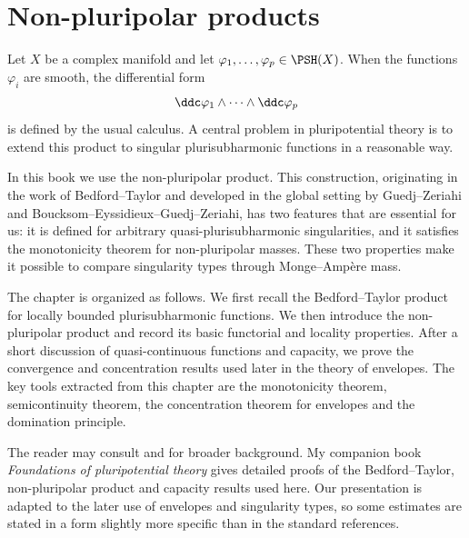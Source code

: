 \chapter{Non-pluripolar products}
\label{chap:npp}

Let $X$ be a complex manifold and let $\varphi_1,\ldots,\varphi_p\in\PSH(X)$. When the functions $\varphi_i$ are smooth, the differential form
\begin{equation}\label{eq:mixedMAtype}
    \ddc\varphi_1\wedge\cdots\wedge\ddc\varphi_p
\end{equation}
is defined by the usual calculus. A central problem in pluripotential theory is to extend this product to singular plurisubharmonic functions in a reasonable way.

In this book we use the non-pluripolar product. This construction, originating in the work of Bedford--Taylor and developed in the global setting by Guedj--Zeriahi and Boucksom--Eyssidieux--Guedj--Zeriahi, has two features that are essential for us: it is defined for arbitrary quasi-plurisubharmonic singularities, and it satisfies the monotonicity theorem for non-pluripolar masses. These two properties make it possible to compare singularity types through Monge--Amp\`ere mass.

The chapter is organized as follows. We first recall the Bedford--Taylor product for locally bounded plurisubharmonic functions. We then introduce the non-pluripolar product and record its basic functorial and locality properties. After a short discussion of quasi-continuous functions and capacity, we prove the convergence and concentration results used later in the theory of envelopes. The key tools extracted from this chapter are the monotonicity theorem, semicontinuity theorem, the concentration theorem for envelopes and the domination principle.

The reader may consult \cite{BEGZ10} and \cite{DDNLsurv} for broader background. My companion book \emph{Foundations of pluripotential theory} \cite[Chapters~9--10, 15--16]{FPT} gives detailed proofs of the Bedford--Taylor, non-pluripolar product and capacity results used here. Our presentation is adapted to the later use of envelopes and singularity types, so some estimates are stated in a form slightly more specific than in the standard references.



